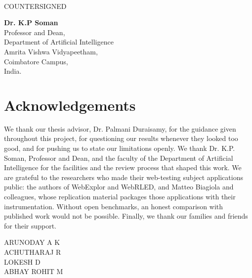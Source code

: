 \documentclass[a4paper, 12pt]{report}
\theoremstyle{definition}
\begin{document}
	\vspace*{1cm}
	 \\
	\vfill
	\begin{center}
		\large{COUNTERSIGNED}\\
	\end{center}
	\vspace{0.6in}

\begin{center}
		\textbf{Dr. K.P Soman}\\
	Professor and Dean, \\
	Department of Artificial Intelligence \\ Amrita Vishwa Vidyapeetham,\\
	Coimbatore Campus,\\
	India.
\end{center}

	\clearpage
	\tableofcontents

	\chapter*{Acknowledgements}
	We thank our thesis advisor, Dr. Palmani Duraisamy, for the guidance given throughout this
project, for questioning our results whenever they looked too good, and for pushing us to state
our limitations openly. We thank Dr. K.P. Soman, Professor and Dean, and the faculty of the
Department of Artificial Intelligence for the facilities and the review process that shaped
this work. We are grateful to the researchers who made their web-testing subject applications
public: the authors of WebExplor and WebRLED, and Matteo Biagiola and colleagues, whose
replication material packages those applications with their instrumentation. Without open
benchmarks, an honest comparison with published work would not be possible. Finally, we thank
our families and friends for their support.\\
	\vspace{1cm}
	\begin{flushright}
		ARUNODAY A K \\
		ACHUTHARAJ R \\
		LOKESH D \\
		ABHAY ROHIT M
	\end{flushright}
	\listoffigures
	\listoftables
	\newpage
\end{document}

